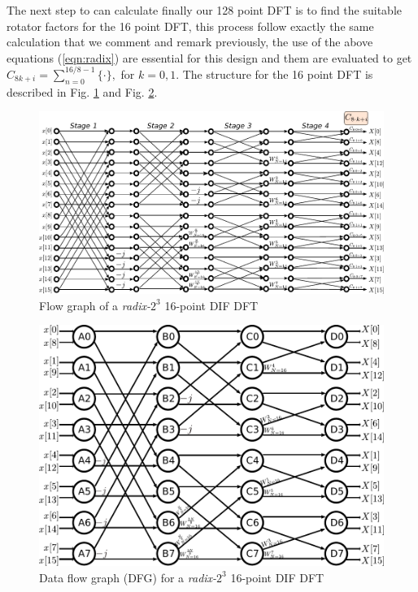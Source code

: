 \documentclass[journal,comsoc]{IEEEtran}
\begin{document}
The next step to can calculate finally our 128 point DFT is to find the suitable rotator factors for the 16 point DFT, this process follow exactly the same calculation that we comment and remark previously, the use of the above equations (\ref{eqn:radix}) are essential for this design and them are evaluated to get $C_{8k+i} = \sum_{n=0}^{16/8-1} \{ \cdot \}, $ for $k=0,1$. The structure for the 16 point DFT is described in Fig. \ref{fig:16puntosradix8conexion} and Fig. \ref{fig:16puntosradix8burbujas}. 
\begin{figure}[h!]
	\centering
	\includegraphics[width=\linewidth]{Diagramas/miSeccionFiguras/16PuntosRadix8Conexion}
	\caption{Flow graph of a \textit{radix-}$2^3$ 16-point DIF DFT}
	\label{fig:16puntosradix8conexion}
\end{figure}
\begin{figure}[h!]
	\centering
	\includegraphics[width=\linewidth]{Diagramas/miSeccionFiguras/16PuntosRadix8Burbujas}
	\caption{Data flow graph (DFG) for a \textit{radix-}$2^3$ 16-point DIF DFT}
	\label{fig:16puntosradix8burbujas}
\end{figure}
\end{document}
